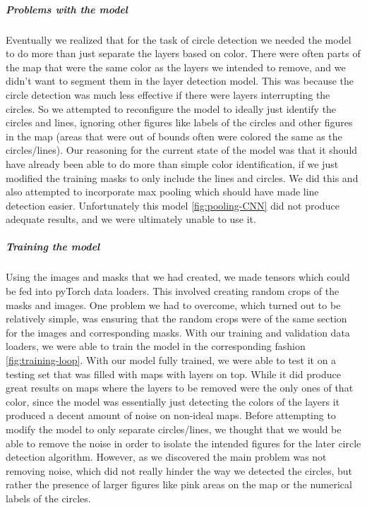 \documentclass[a4paper,12pt]{extarticle}
\begin{document}
\subparagraph{Problems with the model\\}
Eventually we realized that for the task of circle detection we needed the model to do more than just separate the layers based on color.
There were often parts of the map that were the same color as the layers we intended to remove, and we didn't want to segment them in the layer detection model.
This was because the circle detection was much less effective if there were layers interrupting the circles. So we attempted to reconfigure the model to ideally just identify the circles and lines, ignoring other figures like labels of the circles and other figures in the map (areas that were out of bounds often were colored the same as the circles/lines).
Our reasoning for the current state of the model was that it should have already been able to do more than simple color identification, if we just modified the training masks to only include the lines and circles. We did this and also attempted to incorporate max pooling which should have made line detection easier. Unfortunately this model \ref{fig:pooling-CNN} did not produce adequate results, and we were ultimately unable to use it.


\subparagraph{Training the model\\}
Using the images and masks that we had created, we made tensors which could be fed into pyTorch data loaders. This involved creating random crops of the masks and images. One problem we had to overcome, which turned out to be relatively simple, was ensuring that the random crops were of the same section for the images and corresponding masks. With our training and validation data loaders, we were able to train the model in the corresponding fashion \ref{fig:training-loop}. With our model fully trained, we were able to test it on a testing set that was filled with maps with layers on top. While it did produce great results on maps where the layers to be removed were the only ones of that color, since the model was essentially just detecting the colors of the layers it produced a decent amount of noise on non-ideal maps. Before attempting to modify the model to only separate circles/lines, we thought that we would be able to remove the noise in order to isolate the intended figures for the later circle detection algorithm. However, as we discovered the main problem was not removing noise, which did not really hinder the way we detected the circles, but rather the presence of larger figures like pink areas on the map or the numerical labels of the circles. 
\end{document}
